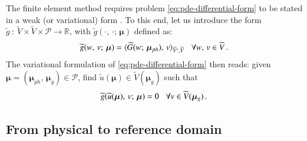 \documentclass[longtitle]{elsarticle}
\numberwithin{equation}{section}
\theoremstyle{theorem}
\theoremstyle{definition}
\theoremstyle{remark}
\theoremstyle{proposition}
\numberwithin{figure}{section}
\newcommand{\wt}[1]{\widetilde{#1}}
\newcommand{\bg}[1]{\boldsymbol{#1}}
\begin{document}
		The finite element method requires problem \eqref{eq:pde-differential-form} to be stated in a weak (or variational) form \cite{Qua10}. To this end, let us introduce the form $\wt{g} ~ : ~ \wt{V} \times \wt{V} \times \mathcal{P} \rightarrow \mathbb{R}$, with $\wt{g}(\cdot, \, \cdot; \, \bg{\mu})$ defined as:
		\begin{equation*}
			\wt{g}(w, \, v; \, \bg{\mu}) = \langle \wt{G}(w; \, \bg{\mu}_{ph}), \, v \rangle_{\wt{V}',\wt{V}} \hspace*{0.3cm} \forall w, \, v \in \wt{V} \, .
		\end{equation*}
		The variational formulation of \eqref{eq:pde-differential-form} then reads: given $\bg{\mu} = (\bg{\mu}_{ph}, \, \bg{\mu}_g) \in \mathcal{P}$, find $\wt{u}(\bg{\mu}) \in \wt{V}(\bg{\mu}_g)$ such that
		\begin{equation*}
			\label{eq:pde-variational-form}
			\wt{g}(\wt{u}(\bg{\mu}), \, v; \, \bg{\mu}) = 0 \hspace*{0.3cm} \forall v \in \wt{V}(\bg{\mu}_g) \, .
		\end{equation*}
				
		
		
	\subsection{From physical to reference domain}
	\label{section:From physical to reference domain}
	
\end{document}
